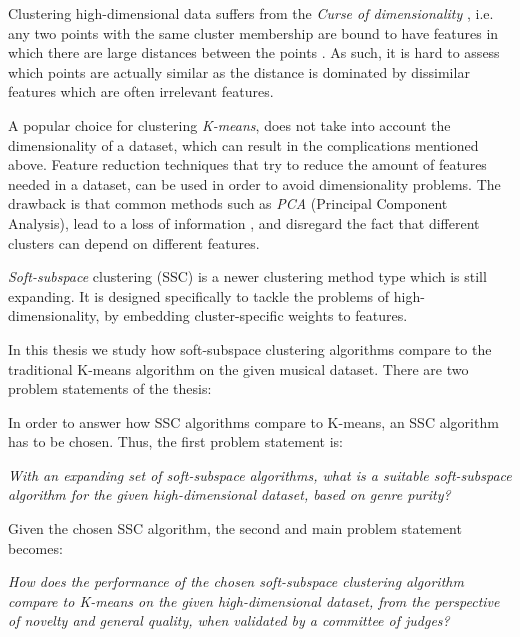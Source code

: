 \documentclass[../report.tex]{subfiles}
\begin{document}
Clustering high-dimensional data suffers from the \textit{Curse of dimensionality} \cite{Jain1999, Parsons2004, Deng2010}, i.e. any two points with the same cluster membership are bound to have features in which there are large distances between the points \cite{Domeniconi2007}. As such, it is hard to assess which points are actually similar as the distance is dominated by dissimilar features which are often irrelevant features.

A popular choice for clustering \textit{K-means}, does not take into account the dimensionality of a dataset, which can result in the complications mentioned above. Feature reduction techniques that try to reduce the amount of features needed in a dataset, can be used in order to avoid dimensionality problems. The drawback is that common methods such as \textit{PCA} (Principal Component Analysis), lead to a loss of information \cite{Gan2016}, and disregard the fact that different clusters can depend on different features.

\textit{Soft-subspace} clustering (SSC) \cite{Gan2006, Jing2007, Gan2016} is a newer clustering method type which is still expanding. It is designed specifically to tackle the problems of high-dimensionality, by embedding cluster-specific weights to features.

In this thesis we study how soft-subspace clustering algorithms compare to the traditional K-means algorithm on the given musical dataset. There are two problem statements of the thesis:

In order to answer how SSC algorithms compare to K-means, an SSC algorithm has to be chosen. Thus, the first problem statement is:

\textit{With an expanding set of soft-subspace algorithms, what is a suitable soft-subspace algorithm for the given high-dimensional dataset, based on genre purity?}

Given the chosen SSC algorithm, the second and main problem statement becomes:

\textit{How does the performance of the chosen soft-subspace clustering algorithm compare to K-means on the given high-dimensional dataset, from the perspective of novelty and general quality, when validated by a committee of judges?}
\end{document}
